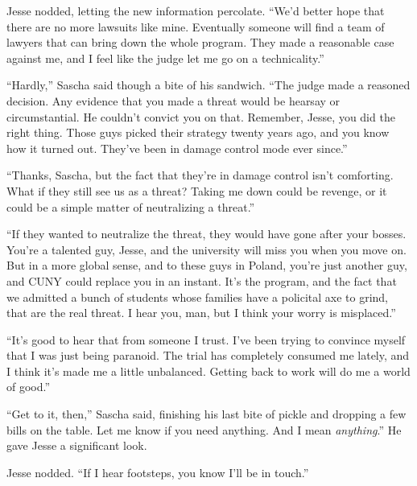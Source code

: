 \documentclass[12pt]{book}
\begin{document}
Jesse nodded, letting the new information percolate.  ``We'd better hope that there are no more lawsuits like mine.  Eventually someone will find a team of lawyers that can bring down the whole program.  They made a reasonable case against me, and I feel like the judge let me go on a technicality.''

``Hardly,'' Sascha said though a bite of his sandwich.  ``The judge made a reasoned decision.  Any evidence that you made a threat would be hearsay or circumstantial.  He couldn't convict you on that.  Remember, Jesse, you did the right thing.  Those guys picked their strategy twenty years ago, and you know how it turned out.  They've been in damage control mode ever since.''

``Thanks, Sascha, but the fact that they're in damage control isn't comforting.  What if they still see us as a threat?  Taking me down could be revenge, or it could be a simple matter of neutralizing a threat.''

``If they wanted to neutralize the threat, they would have gone after your bosses.  You're a talented guy, Jesse, and the university will miss you when you move on.  But in a more global sense, and to these guys in Poland, you're just another guy, and CUNY could replace you in an instant.  It's the program, and the fact that we admitted a bunch of students whose families have a policital axe to grind, that are the real threat.  I hear you, man, but I think your worry is misplaced.''

``It's good to hear that from someone I trust.  I've been trying to convince myself that I was just being paranoid.  The trial has completely consumed me lately, and I think it's made me a little unbalanced.  Getting back to work will do me a world of good.''

``Get to it, then,'' Sascha said, finishing his last bite of pickle and dropping a few bills on the table.  Let me know if you need anything.  And I mean \emph{anything}.''  He gave Jesse a significant look.

Jesse nodded.  ``If I hear footsteps, you know I'll be in touch.''

\chapter{}
										
\end{document}
